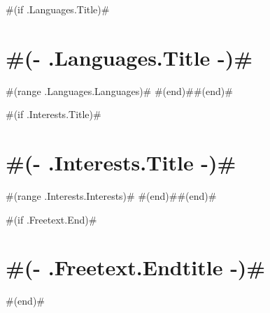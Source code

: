 \documentclass[10pt,a4paper,sans]{moderncv}
\begin{document}
#(if .Languages.Title)#\section{ #(- .Languages.Title -)#  }
#(range .Languages.Languages)#
#(end)##(end)#

#(if .Interests.Title)#\section{ #(- .Interests.Title -)#  }
#(range .Interests.Interests)#
#(end)##(end)#

#(if .Freetext.End)#\section{#(- .Freetext.Endtitle -)#}
#(end)#
\end{document}
